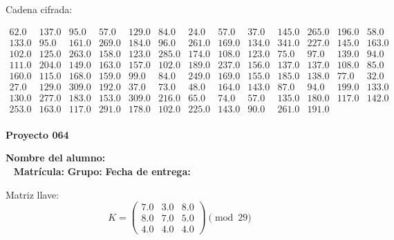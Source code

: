\documentclass[12pt]{article}
\begin{document}
Cadena cifrada:
\begin{center}
$\begin{array}{lllllllllllll}
62.0 & 137.0 & 95.0 & 57.0 & 129.0 & 84.0 & 24.0 & 57.0 & 37.0 & 145.0 & 265.0 & 196.0 & 58.0\\
133.0 & 95.0 & 161.0 & 269.0 & 184.0 & 96.0 & 261.0 & 169.0 & 134.0 & 341.0 & 227.0 & 145.0 & 163.0\\
102.0 & 125.0 & 263.0 & 158.0 & 123.0 & 285.0 & 174.0 & 108.0 & 123.0 & 75.0 & 97.0 & 139.0 & 94.0\\
111.0 & 204.0 & 149.0 & 163.0 & 157.0 & 102.0 & 189.0 & 237.0 & 156.0 & 137.0 & 137.0 & 108.0 & 85.0\\
160.0 & 115.0 & 168.0 & 159.0 & 99.0 & 84.0 & 249.0 & 169.0 & 155.0 & 185.0 & 138.0 & 77.0 & 32.0\\
27.0 & 129.0 & 309.0 & 192.0 & 37.0 & 73.0 & 48.0 & 164.0 & 143.0 & 87.0 & 94.0 & 199.0 & 133.0\\
130.0 & 277.0 & 183.0 & 153.0 & 309.0 & 216.0 & 65.0 & 74.0 & 57.0 & 135.0 & 180.0 & 117.0 & 142.0\\
253.0 & 163.0 & 117.0 & 291.0 & 178.0 & 102.0 & 225.0 & 143.0 & 90.0 & 261.0 & 191.0\\
\end{array}$
\end{center}

\newpage


\textbf{Proyecto 064}

\textbf{Nombre del alumno:} \underline{\hspace{13cm}}\\\
\vspace{1cm}
\textbf{Matrícula:} \underline{\hspace{4cm}} \hspace{1cm}
\textbf{Grupo:} \underline{\hspace{2cm}}
\textbf{Fecha de entrega:} \underline{\hspace{2cm}}

\medskip

Matriz llave:
\[
K = \begin{pmatrix}
7.0 & 3.0 & 8.0\\
8.0 & 7.0 & 5.0\\
4.0 & 4.0 & 4.0
\end{pmatrix} \pmod{29}
\]
\end{document}
